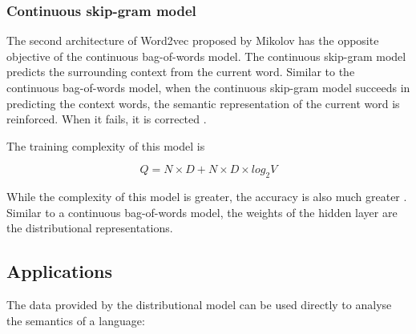 \documentclass[14pt, a4paper]{extreport}
\begin{document}
      \subsubsection{Continuous skip-gram model}
The second architecture of Word2vec proposed by Mikolov has the opposite objective of the continuous bag-of-words model. The continuous skip-gram model predicts the surrounding context from the current word. Similar to the continuous bag-of-words model, when the continuous skip-gram model succeeds in predicting the context words, the semantic representation of the current word is reinforced. When it fails, it is corrected \parencite{mikolov}.

The training complexity of this model is

\[Q = N \times D + N \times D \times log_2{V} \]

While the complexity of this model is greater, the accuracy is also much greater \parencite{mikolov}. Similar to a continuous bag-of-words model, the weights of the hidden layer are the distributional representations.

    \subsection{Applications}
The data provided by the distributional model can be used directly to analyse the semantics of a language:
\end{document}
